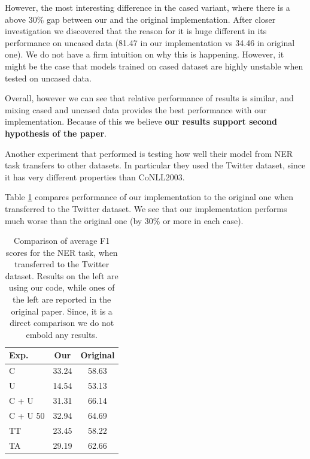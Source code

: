 \documentclass[11pt,a4paper]{article}
\begin{document}
    However, the most interesting difference in the cased variant, where there is a above 30\% gap between our and the original implementation. After closer investigation we discovered that the reason for it is huge different in its performance on uncased data (81.47 in our implementation vs 34.46 in original one). We do not have a firm intuition on why this is happening. However, it might be the case that models trained on cased dataset are highly unstable when tested on uncased data.

    Overall, however we can see that relative performance of results is similar, and mixing cased and uncased data provides the best performance with our implementation. Because of this we believe \textbf{our results support second hypothesis of the paper}.

    Another experiment that \cite{ner-and-pos-original} performed is testing how well their model from NER task transfers to other datasets. In particular they used the Twitter dataset, since it has very different properties than CoNLL2003.

    Table \ref{tab:ner-twitter-comp} compares performance of our implementation to the original one when transferred to the Twitter dataset. We see that our implementation performs much worse than the original one (by 30\% or more in each case).

    \begin{table}[h]
        \centering
        \begin{tabular}{|l|c|c|}
            \hline
            Exp. & Our & Original \\
            \hline
            C        & 33.24 & 58.63 \\
            U        & 14.54 & 53.13 \\
            C + U    & 31.31 & 66.14 \\
            C + U 50 & 32.94 & 64.69 \\
            TT       & 23.45 & 58.22 \\
            TA       & 29.19 & 62.66 \\
            \hline
        \end{tabular}
        \caption{Comparison of average F1 scores for the NER task, when transferred to the Twitter dataset. Results on the left are using our code, while ones of the left are reported in the original paper. Since, it is a direct comparison we do not embold any results.}
        \label{tab:ner-twitter-comp}
    \end{table}
\end{document}
